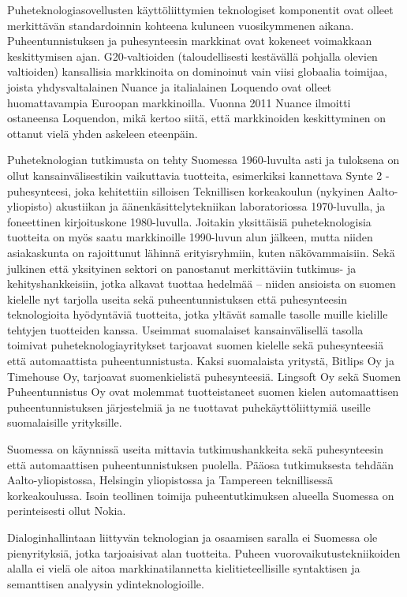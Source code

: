 \documentclass[]{../../metanetpaper}
\begin{document}
\begin{Parallel}[c]{77mm}{77mm}
{Puheteknologiasovellusten käyttöliittymien teknologiset komponentit
ovat olleet merkittävän standardoinnin kohteena kuluneen vuosikymmenen
aikana.  Puheentunnistuksen ja puhesynteesin markkinat ovat kokeneet
voimakkaan keskittymisen ajan. G20-valtioiden (taloudellisesti
kestävällä pohjalla olevien valtioiden) kansallisia markkinoita on
dominoinut vain viisi globaalia toimijaa, joista yhdysvaltalainen
Nuance ja italialainen Loquendo ovat olleet huomattavampia Euroopan
markkinoilla. Vuonna 2011 Nuance ilmoitti ostaneensa Loquendon, mikä
kertoo siitä, että markkinoiden keskittyminen on ottanut vielä yhden
askeleen eteenpäin.

Puheteknologian tutkimusta on tehty Suomessa 1960-luvulta asti ja
tuloksena on ollut kansainvälisestikin vaikuttavia tuotteita,
esimerkiksi kannettava Synte 2 -puhesynteesi, joka kehitettiin
silloisen Teknillisen korkeakoulun (nykyinen Aalto-yliopisto)
akustiikan ja äänenkäsittelytekniikan laboratoriossa 1970-luvulla, ja
foneettinen kirjoituskone 1980-luvulla. Joitakin yksittäisiä
puheteknologisia tuotteita on myös saatu markkinoille 1990-luvun alun
jälkeen, mutta niiden asiakaskunta on rajoittunut lähinnä
erityisryhmiin, kuten näkövammaisiin. Sekä julkinen että yksityinen
sektori on panostanut merkittäviin tutkimus- ja kehityshankkeisiin,
jotka alkavat tuottaa hedelmää – niiden ansioista on suomen kielelle
nyt tarjolla useita sekä puheentunnistuksen että puhesynteesin
teknologioita hyödyntäviä tuotteita, jotka yltävät samalle tasolle
muille kielille tehtyjen tuotteiden kanssa. Useimmat suomalaiset
kansainvälisellä tasolla toimivat puheteknologiayritykset tarjoavat
suomen kielelle sekä puhesynteesiä että automaattista
puheentunnistusta. Kaksi suomalaista yritystä, Bitlips Oy ja Timehouse
Oy, tarjoavat suomenkielistä puhesynteesiä. Lingsoft Oy sekä Suomen
Puheentunnistus Oy ovat molemmat tuotteistaneet suomen kielen
automaattisen puheentunnistuksen järjestelmiä ja ne tuottavat
puhekäyttöliittymiä useille suomalaisille yrityksille.

Suomessa on käynnissä useita mittavia tutkimushankkeita sekä
puhesynteesin että automaattisen puheentunnistuksen puolella. Pääosa
tutkimuksesta tehdään Aalto-yliopistossa, Helsingin yliopistossa ja
Tampereen teknillisessä korkeakoulussa. Isoin teollinen toimija
puheentutkimuksen alueella Suomessa on perinteisesti ollut Nokia.

Dialoginhallintaan liittyvän teknologian ja osaamisen saralla ei
Suomessa ole pienyrityksiä, jotka tarjoaisivat alan tuotteita. Puheen
vuorovaikutustekniikoiden alalla ei vielä ole aitoa markkinatilannetta
kielitieteellisille syntaktisen ja semanttisen analyysin
ydinteknologioille.

}
\end{Parallel}
\end{document}

